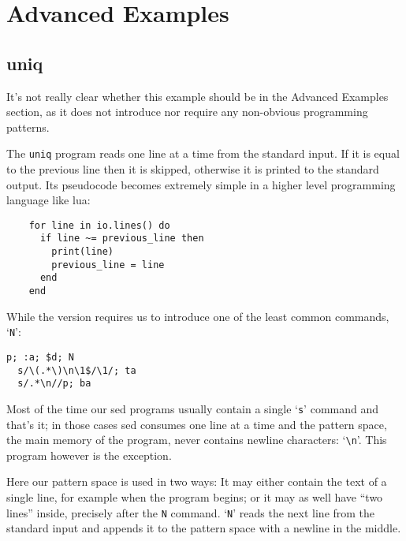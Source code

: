 \section{Advanced Examples}

\subsection{uniq}

It's not really clear whether this example should be in the Advanced Examples
section, as it does not introduce nor require any non-obvious programming
patterns.

The {\tt uniq} program reads one line at a time from the standard input.
If it is equal to the previous line then it is skipped, otherwise it is printed
to the standard output.  Its pseudocode becomes extremely simple in a higher
level programming language like lua:

	\begin{Verbatim}
	for line in io.lines() do
	  if line ~= previous_line then
	    print(line)
	    previous_line = line
	  end
	end
	\end{Verbatim}

While the \sed version requires us to introduce one of the least common
commands, `{\tt N}':

\begin{Verbatim}
p; :a; $d; N
  s/\(.*\)\n\1$/\1/; ta
  s/.*\n//p; ba
\end{Verbatim}

Most of the time our sed programs usually contain a single `{\tt s}' command
and that's it; in those cases sed consumes one line at a time and the pattern
space, the main memory of the program, never contains newline characters:
`\verb|\n|'.  This program however is the exception.

Here our pattern space is used in two ways: It may either contain the text of a
single line, for example when the program begins; or it may as well have ``two
lines'' inside, precisely after the {\tt N} command.
`{\tt N}' reads the next line from the standard input and appends it to the
pattern space with a newline in the middle.

